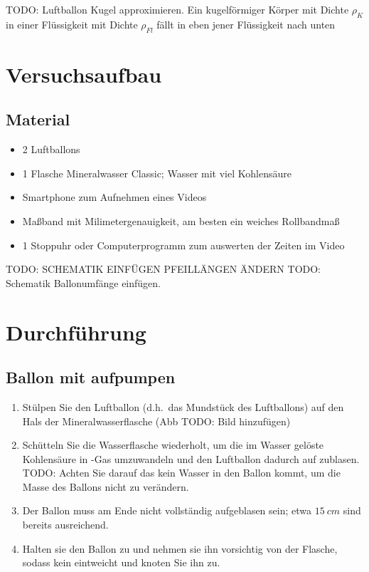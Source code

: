 \documentclass{article}
\begin{document}
    TODO: Luftballon Kugel approximieren. Ein kugelförmiger Körper mit Dichte \(\rho_K\) in einer Flüssigkeit mit Dichte \(\rho_{Fl}\) fällt in eben jener Flüssigkeit nach unten

    \section{Versuchsaufbau}
        \subsection{Material}
        \begin{itemize}
            \item 2 Luftballons
            \item 1 Flasche Mineralwasser Classic; Wasser mit viel Kohlensäure
            \item Smartphone zum Aufnehmen eines Videos
            \item Maßband mit Milimetergenauigkeit, am besten ein weiches Rollbandmaß
            \item 1 Stoppuhr oder Computerprogramm zum auswerten der Zeiten im Video
        \end{itemize}

    TODO: SCHEMATIK EINFÜGEN PFEILLÄNGEN ÄNDERN
    TODO: Schematik Ballonumfänge einfügen.

    \section{Durchführung}
        \subsection{Ballon mit \texorpdfstring{}{CO2} aufpumpen}
            \begin{enumerate}
                \item Stülpen Sie den Luftballon (d.h.\ das Mundstück des Luftballons) auf den Hals der Mineralwasserflasche (Abb TODO: Bild hinzufügen)
                \item Schütteln Sie die Wasserflasche wiederholt, um die im Wasser gelöste Kohlensäure in -Gas umzuwandeln und den Luftballon dadurch auf zublasen.
                TODO: Achten Sie darauf das kein Wasser in den Ballon kommt, um die Masse des Ballons nicht zu verändern.
                \item Der Ballon muss am Ende nicht vollständig aufgeblasen sein; etwa \(\SI{15}{cm}\) sind bereits ausreichend.
                \item Halten sie den Ballon zu und nehmen sie ihn vorsichtig von der Flasche, sodass kein  eintweicht und knoten Sie ihn zu.
            \end{enumerate}
        
\end{document}
